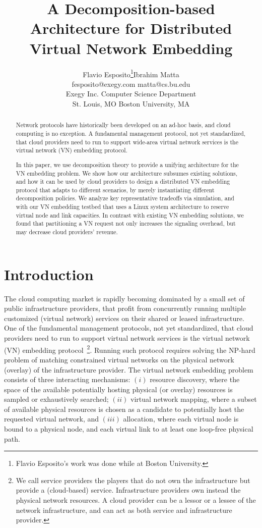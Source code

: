 \documentclass[a4paper, 10pt, conference]{ieeeconf}
\author{
\begin{tabular}{cccc}
\vspace{-0.05in}
Flavio Esposito\thanks{Flavio Esposito's work was done while at Boston University.} &&   Ibrahim Matta   \\
{\small \; fesposito@exegy.com } && {\small \; matta@cs.bu.edu } \\
{\normalsize Exegy Inc. } && \normalsize{Computer Science Department} \\
{\normalsize St. Louis, MO } && \normalsize{Boston University, MA}  
\end{tabular}
}
\title{\Large \bf
A Decomposition-based Architecture for Distributed Virtual Network Embedding 
}
\begin{document}
\maketitle
\thispagestyle{empty}
\pagestyle{empty}

\begin{abstract}
Network protocols have historically been developed on an ad-hoc basis, and cloud computing is no exception. A fundamental management protocol, not yet standardized, that cloud providers need to run to support wide-area virtual network services is the virtual network (VN) embedding protocol. 

In this paper, we use decomposition theory to provide a unifying architecture  for the VN embedding problem. We show how our architecture subsumes existing solutions, and how it can be used by cloud providers to design a distributed VN embedding protocol that adapts to different scenarios, by merely instantiating different decomposition policies. We analyze key representative tradeoffs via simulation, and with our VN embedding testbed that uses a Linux system architecture to reserve virtual node and link capacities. 
In contrast with existing VN embedding solutions, we found that partitioning a VN request not only increases the signaling overhead, but may decrease cloud providers' revenue.
\end{abstract}
\vspace{-2mm}



\section{Introduction}\label{sec:intro}



The cloud computing market is rapidly becoming dominated by a small set of public infrastructure providers, that profit from concurrently running multiple customized (virtual network) services on their shared or leased infrastructure. 
One of the fundamental management protocols, not yet standardized, that cloud providers need to run to support virtual network services is the virtual network (VN) embedding protocol~\footnote{We call service providers the players that do not own the infrastructure but provide a (cloud-based) service. Infrastructure providers own instead the physical network resources. A cloud provider can be a lessor or a lessee of the network infrastructure, and can act as both service and infrastructure provider.}. 
Running such protocol requires solving the NP-hard problem of matching constrained virtual networks on the physical network (overlay) of the infrastructure provider. The virtual network embedding problem consists of three interacting mechanisms: $(i)$ resource discovery, where the space of the available potentially hosting physical (or overlay) resources is sampled or exhaustively searched; $(ii)$ virtual network mapping, where a subset of  available physical resources is chosen as a candidate to potentially host the requested virtual network, and $(iii)$ allocation, where each virtual node is bound to a physical node, and each virtual link to at least one loop-free physical path. 
\end{document}
